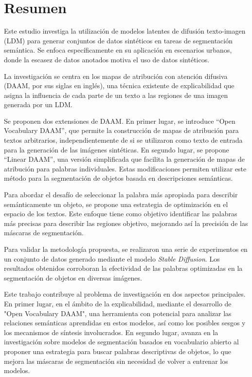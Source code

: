  \setcounter{page}{1}
\chapter*{Resumen}

Este estudio investiga la utilización de modelos latentes de difusión texto-imagen (LDM) para generar conjuntos de datos sintéticos en tareas de segmentación semántica. Se enfoca específicamente en su aplicación en escenarios urbanos, donde la escasez de datos anotados motiva el uso de datos sintéticos.

La investigación se centra en los mapas de atribución con atención difusiva (DAAM, por sus siglas en inglés), una técnica existente de explicabilidad que asigna la influencia de cada parte de un texto a las regiones de una imagen generada por un LDM.

Se proponen dos extensiones de DAAM. En primer lugar, se introduce ``Open Vocabulary DAAM'', que permite la construcción de mapas de atribución para textos arbitrarios, independientemente de si se utilizaron como texto de entrada para la generación de las imágenes sintéticas. En segundo lugar, se propone ``Linear DAAM'', una versión simplificada que facilita la generación de mapas de atribución para palabras individuales. Estas modificaciones permiten utilizar este método para la segmentación de objetos basada en descripciones semánticas.

Para abordar el desafío de seleccionar la palabra más apropiada para describir semánticamente un objeto, se propone una estrategia de optimización en el espacio de los textos. Este enfoque tiene como objetivo identificar las palabras más precisas para describir las regiones objetivo, mejorando así la precisión de las máscaras de segmentación.

Para validar la metodología propuesta, se realizaron una serie de experimentos en un conjunto de datos generado mediante el modelo \emph{Stable Diffusion}. Los resultados obtenidos corroboran la efectividad de las palabras optimizadas en la segmentación de objetos en diversas imágenes.

Este trabajo contribuye al problema de investigación en dos aspectos principales. En primer lugar, en el ámbito de la explicabilidad, mediante el desarrollo de "Open Vocabulary DAAM", una herramienta con potencial para analizar las relaciones semánticas aprendidas en estos modelos, así como los posibles sesgos y los mecanismos de síntesis involucrados. En segundo lugar, avanza en la investigación sobre modelos de segmentación basados en vocabulario abierto al proponer una estrategia para buscar palabras descriptivas de objetos, lo que mejora las máscaras de segmentación sin necesidad de volver a entrenar los modelos.

